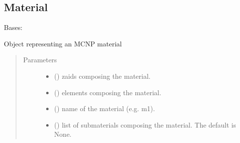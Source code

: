 \documentclass[letterpaper,10pt,english]{sphinxmanual}
\begin{document}
\subsection{Material}
\label{\detokenize{api/inputgeneration:material}}

\begin{fulllineitems}
\label{\detokenize{api/inputgeneration:matreader.Material}}
Bases: 

Object representing an MCNP material
\begin{quote}\begin{description}
\item[{Parameters}] \leavevmode\begin{itemize}
\item {} 
 (\sphinxstyleliteralemphasis{\sphinxupquote{{[}}}\sphinxstyleliteralemphasis{\sphinxupquote{{]}}}) \textendash{} zaids composing the material.

\item {} 
 (\sphinxstyleliteralemphasis{\sphinxupquote{{[}}}\sphinxstyleliteralemphasis{\sphinxupquote{{]}}}) \textendash{} elements composing the material.

\item {} 
 () \textendash{} name of the material (e.g. m1).

\item {} 
 (\sphinxstyleliteralemphasis{\sphinxupquote{{[}}}\sphinxstyleliteralemphasis{\sphinxupquote{{]}}}\sphinxstyleliteralemphasis{\sphinxupquote{, }}) \textendash{} list of submaterials composing the material. The default is None.


\end{itemize}
\end{description}
\end{quote}
\end{fulllineitems}
\end{document}
